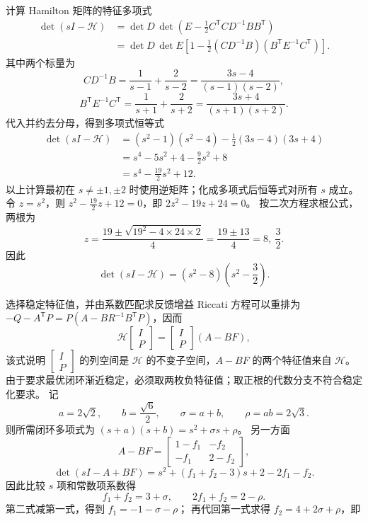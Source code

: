 \documentclass[11pt]{article}
\begin{document}
\begin{solution}
\begin{proofstep}{计算 Hamilton 矩阵的特征多项式}
\[
 \begin{aligned}
 \det(sI-\mathcal H)
 &=\det D\,\det\left(E-\tfrac12C^{\mathsf T}CD^{-1}BB^{\mathsf T}\right)\\
 &=\det D\,\det E\left[1-\tfrac12(CD^{-1}B)(B^{\mathsf T}E^{-1}C^{\mathsf T})\right].
 \end{aligned}
\]
其中两个标量为
\[
 CD^{-1}B=\frac1{s-1}+\frac2{s-2}
 =\frac{3s-4}{(s-1)(s-2)},
\]
\[
 B^{\mathsf T}E^{-1}C^{\mathsf T}=\frac1{s+1}+\frac2{s+2}
 =\frac{3s+4}{(s+1)(s+2)}.
\]
代入并约去分母，得到多项式恒等式
\[
 \begin{aligned}
 \det(sI-\mathcal H)
 &=(s^2-1)(s^2-4)-\frac12(3s-4)(3s+4)\\
 &=s^4-5s^2+4-\frac92s^2+8\\
 &=s^4-\frac{19}{2}s^2+12.
 \end{aligned}
\]
以上计算最初在 $s\ne\pm1,\pm2$ 时使用逆矩阵；化成多项式后恒等式对所有 $s$ 成立。
令 $z=s^2$，则 $z^2-\tfrac{19}2z+12=0$，即 $2z^2-19z+24=0$。
按二次方程求根公式，两根为
\[
 z=\frac{19\pm\sqrt{19^2-4\times24\times2}}4
 =\frac{19\pm13}{4}=8,\ \frac32.
\]
因此
\[
 \det(sI-\mathcal H)=(s^2-8)\left(s^2-\frac32\right).
\]
\end{proofstep}
\begin{proofstep}{选择稳定特征值，并由系数匹配求反馈增益}
Riccati 方程可以重排为
$-Q-A^{\mathsf T}P=P(A-BR^{-1}B^{\mathsf T}P)$，因而
\[
 \mathcal H\begin{bmatrix}I\\P\end{bmatrix}
 =\begin{bmatrix}I\\P\end{bmatrix}(A-BF),
\]
该式说明 $\begin{bmatrix}I\\P\end{bmatrix}$ 的列空间是
$\mathcal H$ 的不变子空间，$A-BF$ 的两个特征值来自 $\mathcal H$。
由于要求最优闭环渐近稳定，必须取两枚负特征值；取正根的代数分支不符合稳定化要求。
记
\[
 a=2\sqrt2,\qquad b=\frac{\sqrt6}{2},\qquad
 \sigma=a+b,\qquad \rho=ab=2\sqrt3.
\]
则所需闭环多项式为 $(s+a)(s+b)=s^2+\sigma s+\rho$。
另一方面
\[
 A-BF=\begin{bmatrix}1-f_1&-f_2\\-f_1&2-f_2\end{bmatrix},
\]
\[
 \det(sI-A+BF)=s^2+(f_1+f_2-3)s+2-2f_1-f_2.
\]
因此比较 $s$ 项和常数项系数得
\[
 f_1+f_2=3+\sigma,\qquad 2f_1+f_2=2-\rho.
\]
第二式减第一式，得到 $f_1=-1-\sigma-\rho$；
再代回第一式求得 $f_2=4+2\sigma+\rho$，即

\end{proofstep}
\end{solution}
\end{document}
